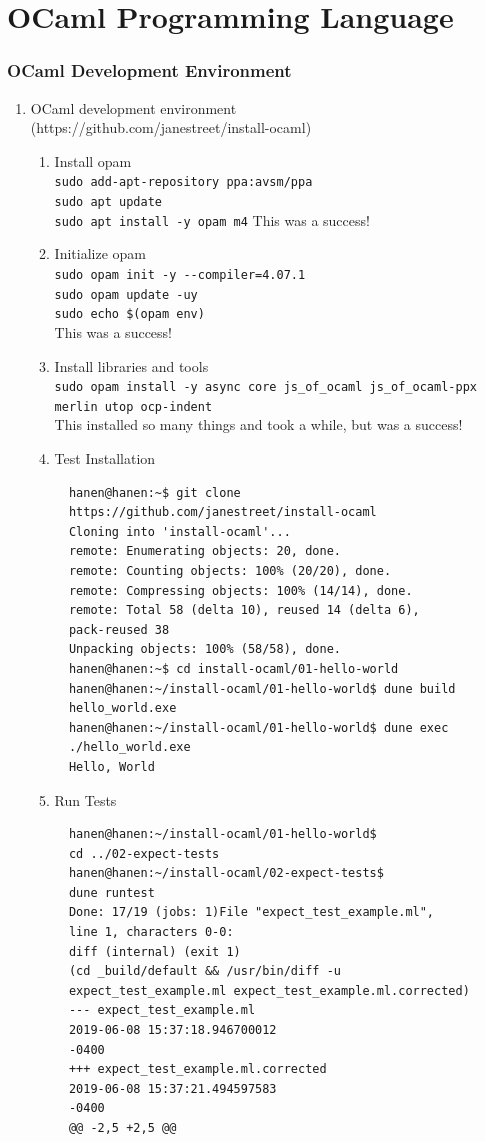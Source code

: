 \chapter{OCaml Programming Language}
\label{ocamlprogramminglanguage}

\subsection{OCaml Development Environment}
\begin{enumerate}
\item OCaml development environment \\ (https://github.com/janestreet/install-ocaml)
  \begin{enumerate}
  \item Install opam \\
    \texttt{sudo add-apt-repository ppa:avsm/ppa \\sudo apt update \\sudo apt install -y opam m4} 
    This was a success!
  \item Initialize opam\\ 
    \verb|sudo opam init -y --compiler=4.07.1| \\
    \verb|sudo opam update -uy| \\
    \verb|sudo echo $(opam env)| \\
    This was a success!
  \item Install libraries and tools \\
    \verb|sudo opam install -y async core js_of_ocaml js_of_ocaml-ppx| \\ 
    \verb|merlin utop ocp-indent| \\
    This installed so many things and took a while, but was a success!
  \item Test Installation
\begin{verbatim}
  hanen@hanen:~$ git clone 
  https://github.com/janestreet/install-ocaml 
  Cloning into 'install-ocaml'...
  remote: Enumerating objects: 20, done.
  remote: Counting objects: 100% (20/20), done.
  remote: Compressing objects: 100% (14/14), done.
  remote: Total 58 (delta 10), reused 14 (delta 6), 
  pack-reused 38
  Unpacking objects: 100% (58/58), done.
  hanen@hanen:~$ cd install-ocaml/01-hello-world
  hanen@hanen:~/install-ocaml/01-hello-world$ dune build 
  hello_world.exe
  hanen@hanen:~/install-ocaml/01-hello-world$ dune exec 
  ./hello_world.exe
  Hello, World
\end{verbatim}
\item Run Tests
\begin{verbatim}
  hanen@hanen:~/install-ocaml/01-hello-world$ 
  cd ../02-expect-tests
  hanen@hanen:~/install-ocaml/02-expect-tests$ 
  dune runtest
  Done: 17/19 (jobs: 1)File "expect_test_example.ml", 
  line 1, characters 0-0:
  diff (internal) (exit 1)
  (cd _build/default && /usr/bin/diff -u 
  expect_test_example.ml expect_test_example.ml.corrected)
  --- expect_test_example.ml      
  2019-06-08 15:37:18.946700012 
  -0400
  +++ expect_test_example.ml.corrected    
  2019-06-08 15:37:21.494597583 
  -0400
  @@ -2,5 +2,5 @@
  

\end{verbatim}
\end{enumerate}
\end{enumerate}
